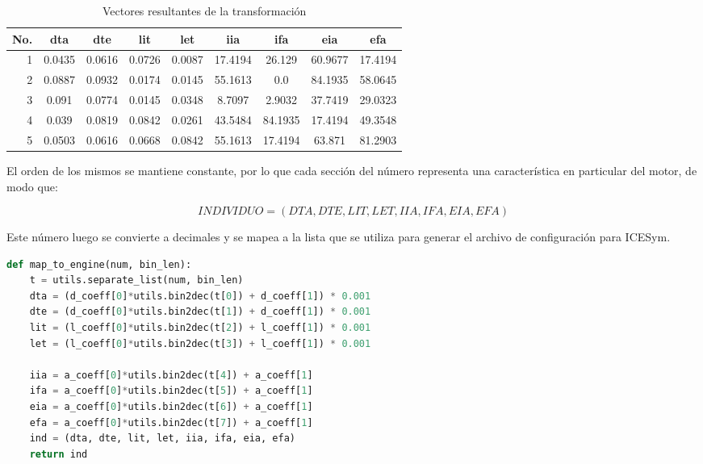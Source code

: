 \begin{table}
    \centering
        \begin{tabular}{rcccccccc} \toprule
            No. & dta    & dte    & lit    & let    & iia     & ifa     & eia     & efa     \\ \midrule
            1   & 0.0435 & 0.0616 & 0.0726 & 0.0087 & 17.4194 & 26.129  & 60.9677 & 17.4194 \\
            2   & 0.0887 & 0.0932 & 0.0174 & 0.0145 & 55.1613 & 0.0     & 84.1935 & 58.0645 \\
            3   & 0.091  & 0.0774 & 0.0145 & 0.0348 & 8.7097  & 2.9032  & 37.7419 & 29.0323 \\
            4   & 0.039  & 0.0819 & 0.0842 & 0.0261 & 43.5484 & 84.1935 & 17.4194 & 49.3548 \\
            5   & 0.0503 & 0.0616 & 0.0668 & 0.0842 & 55.1613 & 17.4194 & 63.871  & 81.2903 \\ \bottomrule
        \end{tabular}
    \caption{Vectores resultantes de la transformación}\label{tab:mapeo_post}
\end{table}

El orden de los mismos se mantiene constante, por lo que cada sección del número
representa una característica en particular del motor, de modo que:

\begin{equation}
    INDIVIDUO = (DTA, DTE, LIT, LET, IIA, IFA, EIA, EFA) \nonumber
\end{equation}

Este número luego se convierte a decimales y se mapea a la lista que se utiliza
para generar el archivo de configuración para ICESym.
%

\begin{lstlisting}[language=Python]
def map_to_engine(num, bin_len):
    t = utils.separate_list(num, bin_len)
    dta = (d_coeff[0]*utils.bin2dec(t[0]) + d_coeff[1]) * 0.001
    dte = (d_coeff[0]*utils.bin2dec(t[1]) + d_coeff[1]) * 0.001
    lit = (l_coeff[0]*utils.bin2dec(t[2]) + l_coeff[1]) * 0.001
    let = (l_coeff[0]*utils.bin2dec(t[3]) + l_coeff[1]) * 0.001

    iia = a_coeff[0]*utils.bin2dec(t[4]) + a_coeff[1]
    ifa = a_coeff[0]*utils.bin2dec(t[5]) + a_coeff[1]
    eia = a_coeff[0]*utils.bin2dec(t[6]) + a_coeff[1]
    efa = a_coeff[0]*utils.bin2dec(t[7]) + a_coeff[1]
    ind = (dta, dte, lit, let, iia, ifa, eia, efa)
    return ind
\end{lstlisting}

